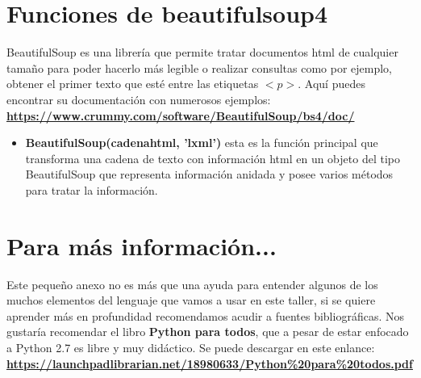 \documentclass{article}
\begin{document}
\section{Funciones de beautifulsoup4}
	\justify
	BeautifulSoup es una librería que permite tratar documentos html de cualquier tamaño para poder
	hacerlo más legible o realizar consultas como por ejemplo, obtener el primer texto que esté entre las etiquetas $<p>.$
	Aquí puedes encontrar su documentación con numerosos ejemplos: \textbf{\url{https://www.crummy.com/software/BeautifulSoup/bs4/doc/}}
	\begin{itemize}
		\item \textbf{BeautifulSoup(cadenahtml, 'lxml')} esta es la función principal que transforma una cadena de texto
		con información html en un objeto del tipo BeautifulSoup que representa información anidada y posee varios métodos
		para tratar la información.
	\end{itemize}
	
\section{Para más información...}
\justify 
Este pequeño anexo no es más que una ayuda para entender algunos de los muchos elementos 
del lenguaje que vamos a usar en este taller,
si se quiere aprender más en profundidad recomendamos acudir a fuentes bibliográficas. 
Nos gustaría recomendar el libro \textbf{Python para todos}, que a pesar de estar enfocado a Python 2.7 
es libre y muy didáctico. Se puede descargar en este enlance: \textbf{\url{https://launchpadlibrarian.net/18980633/Python\%20para\%20todos.pdf}}



%
\end{document}
